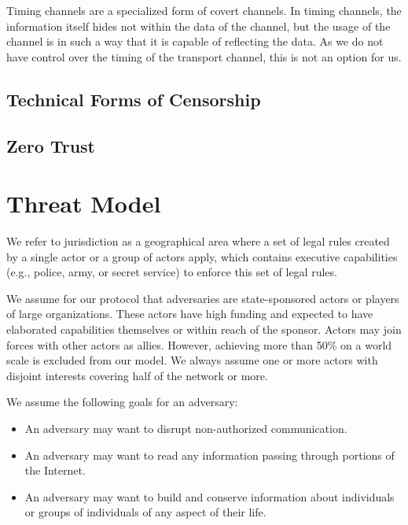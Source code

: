 Timing channels are a specialized form of covert channels. In timing channels, the information itself hides not within the data of the channel, but the usage of the channel is in such a way that it is capable of reflecting the data. As we do not have control over the timing of the transport channel, this is not an option for us.

\section{Technical Forms of Censorship}
\section{Zero Trust}

\chapter{Threat Model}
We refer to jurisdiction as a geographical area where a set of legal rules created by a single actor or a group of actors apply, which contains executive capabilities (e.g., police, army, or secret service) to enforce this set of legal rules.

We assume for our protocol that adversaries are state-sponsored actors or players of large organizations. These actors have high funding and expected to have elaborated capabilities themselves or within reach of the sponsor. Actors may join forces with other actors as allies. However, achieving more than 50\% on a world scale is excluded from our model. We always assume one or more actors with disjoint interests covering half of the network or more. 

We assume the following goals for an adversary:
\begin{itemize}
	\item An adversary may want to disrupt non-authorized communication.
	\item An adversary may want to read any information passing through portions of the Internet.
	\item An adversary may want to build and conserve information about individuals or groups of individuals of any aspect of their life. 
\end{itemize}

